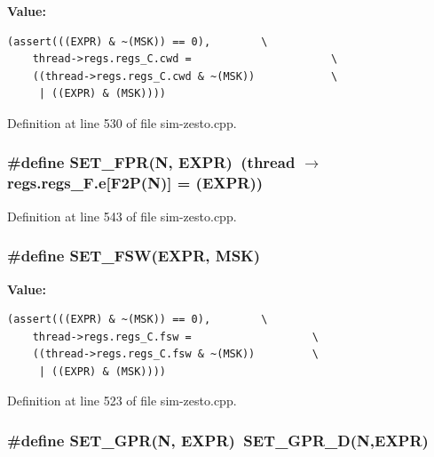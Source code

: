 \textbf{Value:}

\begin{Code}\begin{verbatim}(assert(((EXPR) & ~(MSK)) == 0),        \
    thread->regs.regs_C.cwd =                      \
    ((thread->regs.regs_C.cwd & ~(MSK))            \
     | ((EXPR) & (MSK))))
\end{verbatim}
\end{Code}


Definition at line 530 of file sim-zesto.cpp.
\subsubsection[{SET\_\-FPR}]{\setlength{\rightskip}{0pt plus 5cm}\#define SET\_\-FPR(N, \/  EXPR)~(thread $\rightarrow$ regs.regs\_\-F.e[F2P(N)] = (EXPR))}\label{sim-zesto_8cpp_d1f2e24af906596ccab8c65a695dce70}




Definition at line 543 of file sim-zesto.cpp.
\subsubsection[{SET\_\-FSW}]{\setlength{\rightskip}{0pt plus 5cm}\#define SET\_\-FSW(EXPR, \/  MSK)}\label{sim-zesto_8cpp_9896e158582eb11c95d07047c3fec101}


\textbf{Value:}

\begin{Code}\begin{verbatim}(assert(((EXPR) & ~(MSK)) == 0),        \
    thread->regs.regs_C.fsw =                   \
    ((thread->regs.regs_C.fsw & ~(MSK))         \
     | ((EXPR) & (MSK))))
\end{verbatim}
\end{Code}


Definition at line 523 of file sim-zesto.cpp.
\subsubsection[{SET\_\-GPR}]{\setlength{\rightskip}{0pt plus 5cm}\#define SET\_\-GPR(N, \/  EXPR)~SET\_\-GPR\_\-D(N,EXPR)}\label{sim-zesto_8cpp_68fae1b429c1b8849ca83f455ad6ea38}




